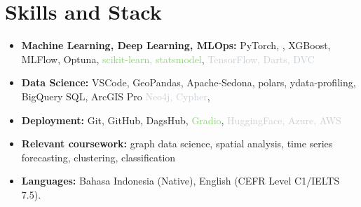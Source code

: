 \documentclass[a4paper, 11pt]{article}
\newcommand{\resumeItem}[2]{
    \item\small{
        \textbf{#1}{#2 \vspace{-2pt}}
    }
}
\newcommand{\resumeItemPaper}[1]{
    \item\small{
            {#1}
    }
}
\newcommand{\resumeItemListStart}{\begin{itemize}[leftmargin=*]\setlength\itemsep{0em}\vspace{-1pt}}
\newcommand{\resumeItemListEnd}{\end{itemize}\vspace{-5pt}}
\begin{document}
    \section{Skills and Stack}
    \resumeItemListStart
    \resumeItem{Machine Learning, Deep Learning, MLOps:}{ %
        PyTorch, , XGBoost, MLFlow, Optuna, 
        \textcolor[HTML]{8bd274}{scikit-learn, statsmodel},
        \textcolor[HTML]{C8cfd4}{TensorFlow, Darts, DVC}
    }
    \resumeItem{Data Science:}{
        VSCode, GeoPandas, Apache-Sedona, polars, ydata-profiling, BigQuery SQL, ArcGIS Pro
        \textcolor[HTML]{C8cfd4}{Neo4j, Cypher}, 
    }
    \resumeItem{Deployment:}{
        Git, GitHub, DagsHub, 
        \textcolor[HTML]{8bd274}{Gradio},
        \textcolor[HTML]{C8cfd4}{HuggingFace, Azure, AWS}
    }
    \resumeItem{Relevant coursework:}{
        graph data science,
        spatial analysis,
        time series forecasting,
        clustering,
        classification
    }
    \resumeItem{Languages:}{
        Bahasa Indonesia (Native), 
        English (CEFR Level C1/IELTS 7.5).
    }
    \resumeItemListEnd
    
    \vspace{-5pt}
\end{document}
